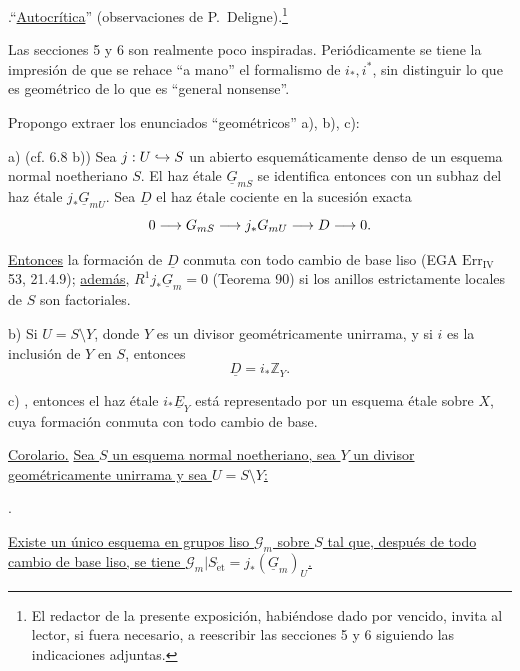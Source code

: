 \medskip
{}.\quad ``\underline{Autocrítica}'' (observaciones de
P.~Deligne).\footnote{El redactor de la presente exposición, habiéndose
dado por vencido, invita al lector, si fuera necesario, a reescribir
las secciones 5 y 6 siguiendo las indicaciones adjuntas.}

Las secciones 5 y 6 son realmente poco inspiradas. Periódicamente se
tiene la impresión de que se rehace ``a mano'' el formalismo de
$i_*,i^*$, sin distinguir lo que es geométrico de lo que es
``general nonsense''.

Propongo extraer los enunciados ``geométricos'' a), b), c):

\smallskip
\noindent a) (cf. 6.8 b)) Sea
$j:\sisi{V}{U}\hookrightarrow S$ un abierto esquemáticamente denso de
un esquema normal noetheriano $S$. El haz étale $\underline G_{mS}$ se
identifica entonces con un subhaz del haz étale
$j_*\underline G_{mU}$. Sea $\underline D$ el haz étale cociente en la
sucesión exacta
\[
 0\longrightarrow\underline G_{mS}\longrightarrow
 j_*\sisi{\underline G_{mS}}{\underline G_{mU}}
 \longrightarrow\underline D\longrightarrow0.
\]


\underline{Entonces} la formación de $\underline D$ conmuta con todo
cambio de base liso (EGA $\mathrm{Err}_{\mathrm{IV}}$ 53, 21.4.9);
\underline{además}, $R^1j_*\underline G_m=0$ (Teorema 90) si los
anillos estrictamente locales de $S$ son factoriales.

\smallskip
\noindent b) Si $U=S\setminus Y$, donde $Y$ es un divisor
geométricamente unirrama, y si $i$ es la inclusión de $Y$ en $S$,
entonces
\[
 \underline D=i_*\mathbb Z_Y.
\]

\smallskip
\noindent c) , entonces el haz étale $i_*\underline E_Y$ está
representado por un esquema étale sobre $X$, cuya formación conmuta con
todo cambio de base.

\medskip
\noindent\underline{Corolario.} \underline{Sea $S$ un esquema normal
noetheriano, sea $Y$ un divisor geométricamente unirrama y sea
$U=S\setminus Y$:}
\begin{center}
\qquad .
\end{center}
\underline{Existe un único esquema en grupos liso $\mathcal G_m$ sobre
$S$ tal que, después de todo cambio de base liso, se tiene
$\mathcal G_m|S_{\mathrm{\acute{e}t}}=j_*(\underline G_m)_U$.}

